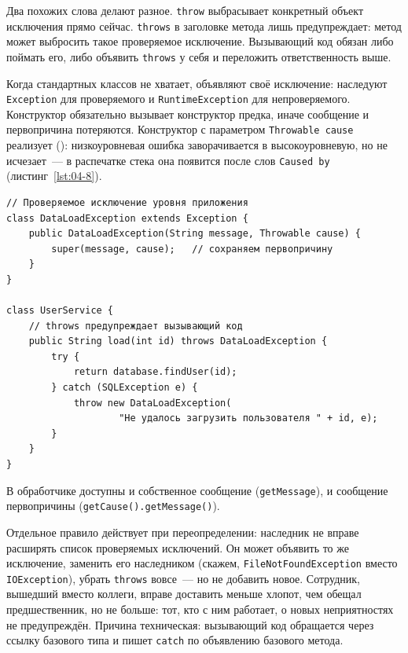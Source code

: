 Два похожих слова делают разное. \texttt{throw} выбрасывает конкретный объект
исключения прямо сейчас. \texttt{throws} в заголовке метода лишь предупреждает:
метод может выбросить такое проверяемое исключение. Вызывающий код обязан либо
поймать его, либо объявить \texttt{throws} у себя и переложить ответственность
выше.

Когда стандартных классов не хватает, объявляют своё исключение: наследуют
\texttt{Exception} для проверяемого и \texttt{RuntimeException} для
непроверяемого. Конструктор обязательно вызывает конструктор предка, иначе
сообщение и первопричина потеряются. Конструктор с параметром
\texttt{Throwable cause} реализует  (): низкоуровневая ошибка заворачивается в высокоуровневую, но не
исчезает~--- в распечатке стека она появится после слов \texttt{Caused by}
(листинг~\ref{lst:04-8}).

\begin{listing}[H]
\begin{verbatim}
// Проверяемое исключение уровня приложения
class DataLoadException extends Exception {
    public DataLoadException(String message, Throwable cause) {
        super(message, cause);   // сохраняем первопричину
    }
}

class UserService {
    // throws предупреждает вызывающий код
    public String load(int id) throws DataLoadException {
        try {
            return database.findUser(id);
        } catch (SQLException e) {
            throw new DataLoadException(
                    "Не удалось загрузить пользователя " + id, e);
        }
    }
}
\end{verbatim}
\caption{Собственное исключение и цепочка причин}
\label{lst:04-8}
\end{listing}

В обработчике доступны и собственное сообщение (\texttt{getMessage}), и
сообщение первопричины (\texttt{getCause().getMessage()}).

Отдельное правило действует при переопределении: наследник не вправе расширять
список проверяемых исключений. Он может объявить то же исключение, заменить его
наследником (скажем, \texttt{FileNotFoundException} вместо
\texttt{IOException}), убрать \texttt{throws} вовсе~--- но не добавить новое.
Сотрудник, вышедший вместо коллеги, вправе доставить меньше хлопот, чем обещал
предшественник, но не больше: тот, кто с ним работает, о новых неприятностях не
предупреждён. Причина техническая: вызывающий код обращается через ссылку
базового типа и пишет \texttt{catch} по объявлению базового метода.

